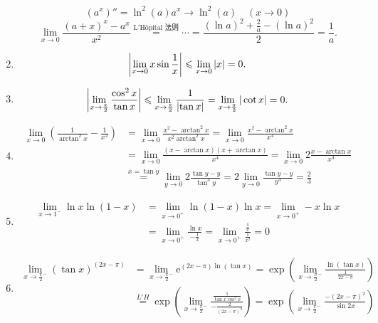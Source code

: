 \begin{solution}
\begin{enumerate}
              $$\left(a^x \right)'' = \ln^2(a) a^x \to \ln^2(a) \quad (x \to 0)$$
              $$\lim_{x \to 0} \frac{(a + x)^x - a^x}{x^2} \overset{\text{L'Hôpital 法则}}{=} \cdots = \frac{(\ln a)^2 + \frac{2}{a} - (\ln a)^2}{2} = \frac{1}{a}.$$
        \item $$\left| \lim_{x \to 0} x \sin \frac{1}{x} \right| \leqslant \lim_{x \to 0} |x| = 0.$$
        \item $$\left| \lim_{x \to \frac{\pi}{2}} \frac{\cos^2 x}{\tan x} \right| \leqslant \lim_{x \to \frac{\pi}{2}} \frac{1}{\left| \tan x \right|} = \lim_{x \to \frac{\pi}{2}} |\cot x| = 0.$$
        \item \begin{align*}
                  \lim_{x \to 0} \left(\frac{1}{\arctan^2 x} - \frac{1}{x^2}\right) & = \lim_{x \to 0} \frac{x^2 - \arctan^2 x}{x^2 \arctan^2 x}    = \lim_{x \to 0} \frac{x^2 - \arctan^2 x}{x^4}                   \\
                                                                                    & = \lim_{x \to 0} \frac{(x - \arctan x)(x + \arctan x)}{x^4}   = \lim_{x \to 0} 2 \frac{x - \arctan x}{x^3}                     \\
                                                                                    & \stackrel{x = \tan y}{=} \lim_{y \to 0} 2 \frac{\tan y - y}{\tan^3 y}  = 2 \lim_{y \to 0} \frac{\tan y - y}{y^3} = \frac{2}{3}
              \end{align*}
        \item \begin{align*}
                  \lim_{x \to 1^-} \ln x \ln(1 - x) & = \lim_{x \to 0^+} \ln(1 - x) \ln x = \lim_{x \to 0^+} -x \ln x                                        \\
                                                    & = \lim_{x \to 0^+} \frac{\ln x}{-\frac{1}{x}} = \lim_{x \to 0^+} \frac{\frac{1}{x}}{\frac{1}{x^2}} = 0
              \end{align*}
        \item \begin{align*}
                  \lim_{x \to \frac{\pi}{2}^-} (\tan x)^{(2x - \pi)} & = \lim_{x \to \frac{\pi}{2}^-} \mathrm{e}^{(2x - \pi) \ln(\tan x)} = \exp\left(\lim_{x \to \frac{\pi}{2}^-} \frac{\ln(\tan x)}{\frac{1}{2x - \pi}}\right)                                               \\
                                                                     & \stackrel{L'H}{=} \exp\left(\lim_{x \to \frac{\pi}{2}^-} \frac{\frac{1}{\tan x \cos^2 x}}{-\frac{2}{(2x - \pi)^2}}\right) = \exp\left(\lim_{x \to \frac{\pi}{2}^-} \frac{-(2x - \pi)^2}{\sin 2x}\right) \\

\end{align*}
\end{enumerate}
\end{solution}
